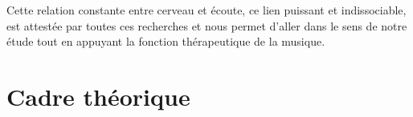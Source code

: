 Cette relation constante entre cerveau et écoute,
ce lien puissant et indissociable, est attestée par toutes ces recherches et nous permet d'aller dans
le sens de notre étude tout en appuyant
la fonction thérapeutique de la musique.








\chapter{Cadre théorique}





